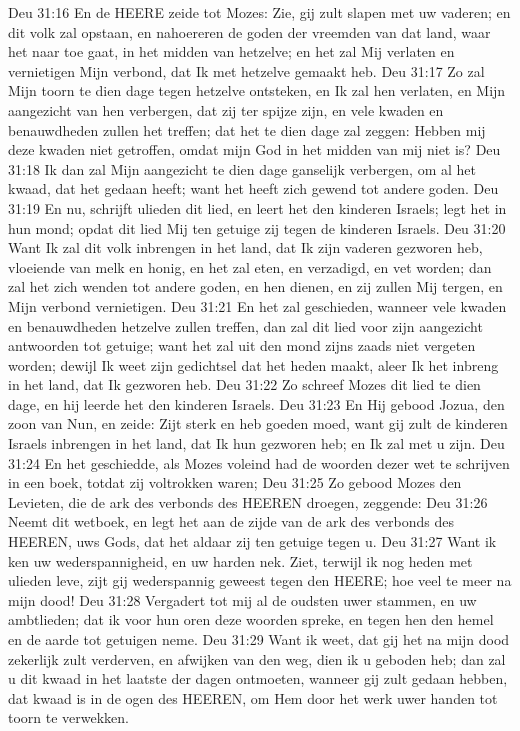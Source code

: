 Deu 31:16  En de HEERE zeide tot Mozes: Zie, gij zult slapen met uw vaderen; en dit volk zal opstaan, en nahoereren de goden der vreemden van dat land, waar het naar toe gaat, in het midden van hetzelve; en het zal Mij verlaten en vernietigen Mijn verbond, dat Ik met hetzelve gemaakt heb.
Deu 31:17  Zo zal Mijn toorn te dien dage tegen hetzelve ontsteken, en Ik zal hen verlaten, en Mijn aangezicht van hen verbergen, dat zij ter spijze zijn, en vele kwaden en benauwdheden zullen het treffen; dat het te dien dage zal zeggen: Hebben mij deze kwaden niet getroffen, omdat mijn God in het midden van mij niet is?
Deu 31:18  Ik dan zal Mijn aangezicht te dien dage ganselijk verbergen, om al het kwaad, dat het gedaan heeft; want het heeft zich gewend tot andere goden.
Deu 31:19  En nu, schrijft ulieden dit lied, en leert het den kinderen Israels; legt het in hun mond; opdat dit lied Mij ten getuige zij tegen de kinderen Israels.
Deu 31:20  Want Ik zal dit volk inbrengen in het land, dat Ik zijn vaderen gezworen heb, vloeiende van melk en honig, en het zal eten, en verzadigd, en vet worden; dan zal het zich wenden tot andere goden, en hen dienen, en zij zullen Mij tergen, en Mijn verbond vernietigen.
Deu 31:21  En het zal geschieden, wanneer vele kwaden en benauwdheden hetzelve zullen treffen, dan zal dit lied voor zijn aangezicht antwoorden tot getuige; want het zal uit den mond zijns zaads niet vergeten worden; dewijl Ik weet zijn gedichtsel dat het heden maakt, aleer Ik het inbreng in het land, dat Ik gezworen heb.
Deu 31:22  Zo schreef Mozes dit lied te dien dage, en hij leerde het den kinderen Israels.
Deu 31:23  En Hij gebood Jozua, den zoon van Nun, en zeide: Zijt sterk en heb goeden moed, want gij zult de kinderen Israels inbrengen in het land, dat Ik hun gezworen heb; en Ik zal met u zijn.
Deu 31:24  En het geschiedde, als Mozes voleind had de woorden dezer wet te schrijven in een boek, totdat zij voltrokken waren;
Deu 31:25  Zo gebood Mozes den Levieten, die de ark des verbonds des HEEREN droegen, zeggende:
Deu 31:26  Neemt dit wetboek, en legt het aan de zijde van de ark des verbonds des HEEREN, uws Gods, dat het aldaar zij ten getuige tegen u.
Deu 31:27  Want ik ken uw wederspannigheid, en uw harden nek. Ziet, terwijl ik nog heden met ulieden leve, zijt gij wederspannig geweest tegen den HEERE; hoe veel te meer na mijn dood!
Deu 31:28  Vergadert tot mij al de oudsten uwer stammen, en uw ambtlieden; dat ik voor hun oren deze woorden spreke, en tegen hen den hemel en de aarde tot getuigen neme.
Deu 31:29  Want ik weet, dat gij het na mijn dood zekerlijk zult verderven, en afwijken van den weg, dien ik u geboden heb; dan zal u dit kwaad in het laatste der dagen ontmoeten, wanneer gij zult gedaan hebben, dat kwaad is in de ogen des HEEREN, om Hem door het werk uwer handen tot toorn te verwekken.
